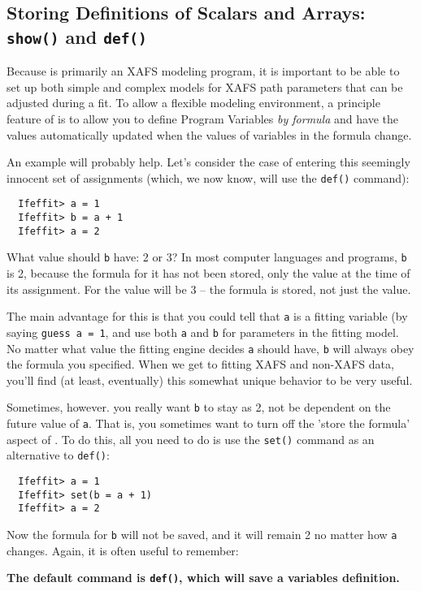\documentclass[11pt]{article}
\begin{document}
\subsection{Storing Definitions of Scalars and Arrays: 
  {\tt{show()}} and {\tt{def()}}}\label{s:datatypes:setdef}

Because {\ifeffit} is primarily an XAFS modeling program, it is important
to be able to set up both simple and complex models for XAFS path
parameters that can be adjusted during a fit.  To allow a flexible
modeling environment, a principle feature of {\ifeffit} is to allow you to
define Program Variables {\emph{by formula}} and have the values
automatically updated when the values of variables in the formula change.

An example will probably help.  Let's consider the case of entering this
seemingly innocent set of assignments (which, we now know, will use the 
{\tt{def()}} command):
{\small\begin{verbatim}
  Ifeffit> a = 1
  Ifeffit> b = a + 1
  Ifeffit> a = 2
\end{verbatim}}\noindent
What value should {\tt{b}} have: 2 or 3?  In most computer languages and
programs, {\tt{b}} is 2, because the formula for it has not been stored,
only the value at the time of its assignment.  For {\ifeffit} the value
will be 3 -- the formula is stored, not just the value.

The main advantage for this is that you could tell {\ifeffit} that {\tt{a}}
is a fitting variable (by saying {\tt{guess a = 1}}, and use both {\tt{a}}
and {\tt{b}} for parameters in the fitting model.  No matter what value the
fitting engine decides {\tt{a}} should have, {\tt{b}} will always obey the
formula you specified.  When we get to fitting XAFS and non-XAFS data,
you'll find (at least, eventually) this somewhat unique behavior to be very
useful. 

Sometimes, however.  you really want {\tt{b}} to stay as 2, not be
dependent on the future value of {\tt{a}}.  That is, you sometimes want to
turn off the 'store the formula' aspect of {\ifeffit}.  To do this, all you
need to do is use the {\tt{set()}} command as an alternative to {\tt{def()}}:
{\small\begin{verbatim}
  Ifeffit> a = 1
  Ifeffit> set(b = a + 1)
  Ifeffit> a = 2
\end{verbatim}}\noindent
Now the formula for {\tt{b}} will not be saved, and it will remain 2 no
matter how {\tt{a}} changes.
Again, it is often useful to remember: 
\par\indent\indent 
{\bf The default command is {\tt{def()}}, which will save a variables definition.}
\end{document}
